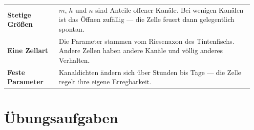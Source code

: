 \begin{warnung}
\begin{center}
{\small
\renewcommand{\arraystretch}{1.5}
\begin{tabular}{@{}P{2.6cm}P{6.0cm}@{}}
\toprule
\textbf{Stetige Größen} & $m$, $h$ und $n$ sind Anteile offener Kanäle. Bei wenigen Kanälen ist das Öffnen zufällig --- die Zelle feuert dann gelegentlich spontan.\\
\textbf{Eine Zellart} & Die Parameter stammen vom Riesenaxon des Tintenfischs. Andere Zellen haben andere Kanäle und völlig anderes Verhalten.\\
\textbf{Feste Parameter} & Kanaldichten ändern sich über Stunden bis Tage --- die Zelle regelt ihre eigene Erregbarkeit.\\
\bottomrule
\end{tabular}}
\end{center}

\begin{center}
\begin{minipage}{0.88\textwidth}
\end{minipage}
\end{center}
\end{warnung}

\section{Übungsaufgaben}

